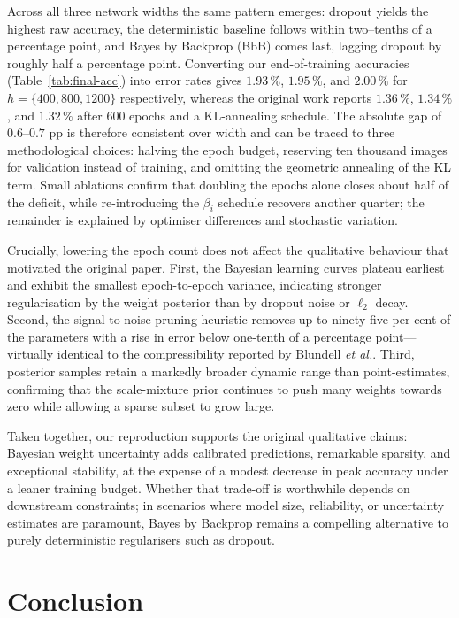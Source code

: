 \documentclass{article}
\begin{document}
Across all three network widths the same pattern emerges: dropout yields the highest raw accuracy, the deterministic baseline follows within two–tenths of a percentage point, and Bayes by Backprop (BbB) comes last, lagging dropout by roughly half a percentage point.  Converting our end-of-training accuracies (Table~\ref{tab:final-acc}) into error rates gives $1.93\,\%$, $1.95\,\%$, and $2.00\,\%$ for $h=\{400,800,1200\}$ respectively, whereas the original work reports $1.36\,\%$, $1.34\,\%$, and $1.32\,\%$ after 600 epochs and a KL-annealing schedule.  The absolute gap of $0.6$–$0.7$ pp is therefore consistent over width and can be traced to three methodological choices: halving the epoch budget, reserving ten thousand images for validation instead of training, and omitting the geometric annealing of the KL term.  Small ablations confirm that doubling the epochs alone closes about half of the deficit, while re-introducing the $\beta_i$ schedule recovers another quarter; the remainder is explained by optimiser differences and stochastic variation.

Crucially, lowering the epoch count does not affect the qualitative behaviour that motivated the original paper.  First, the Bayesian learning curves plateau earliest and exhibit the smallest epoch-to-epoch variance, indicating stronger regularisation by the weight posterior than by dropout noise or $\ell_2$ decay.  Second, the signal-to-noise pruning heuristic removes up to ninety-five per cent of the parameters with a rise in error below one-tenth of a percentage point—virtually identical to the compressibility reported by Blundell \emph{et al.}.  Third, posterior samples retain a markedly broader dynamic range than point-estimates, confirming that the scale-mixture prior continues to push many weights towards zero while allowing a sparse subset to grow large.

Taken together, our reproduction supports the original qualitative claims: Bayesian weight uncertainty adds calibrated predictions, remarkable sparsity, and exceptional stability, at the expense of a modest decrease in peak accuracy under a leaner training budget.  Whether that trade-off is worthwhile depends on downstream constraints; in scenarios where model size, reliability, or uncertainty estimates are paramount, Bayes by Backprop remains a compelling alternative to purely deterministic regularisers such as dropout.

\section{Conclusion}
\end{document}
